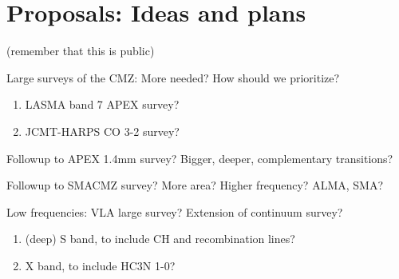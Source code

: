 \section{Proposals: Ideas and plans}
(remember that this is public)

Large surveys of the CMZ: More needed?  How should we prioritize?
\begin{enumerate}
\item LASMA band 7 APEX survey?
\item JCMT-HARPS CO 3-2 survey? 
\end{enumerate}

Followup to APEX 1.4mm survey?  Bigger, deeper, complementary transitions?

Followup to SMACMZ survey?  More area?  Higher frequency?  ALMA, SMA?

Low frequencies: VLA large survey?  Extension of \citet{Law2008b} continuum survey?
\begin{enumerate}
\item (deep) S band, to include CH and recombination lines?  
\item X band, to include HC3N 1-0?
\end{enumerate}